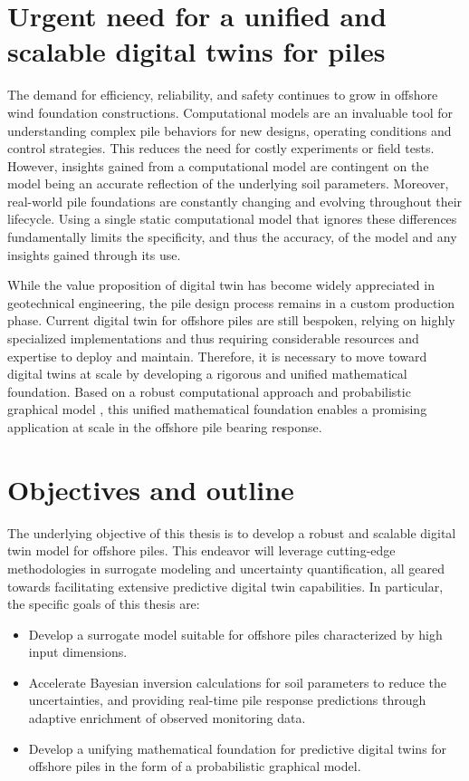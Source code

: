 \section{Urgent need for a unified and scalable digital twins for piles}
The demand for efficiency, reliability, and safety continues to grow in offshore wind foundation constructions. Computational models are an invaluable tool
 for understanding complex pile behaviors for new designs, operating conditions and control strategies. This reduces the need for costly experiments or field tests. However, insights gained from a computational model are contingent on the model being an accurate reflection of the underlying soil parameters. Moreover, real-world pile foundations are constantly changing and evolving throughout their lifecycle. Using a single static computational model that ignores these differences fundamentally limits the specificity,
 and thus the accuracy, of the model and any insights gained through its use.

 While the value proposition of digital twin has become widely appreciated in geotechnical engineering, the pile design process remains in a custom production phase. Current digital twin for offshore piles are still bespoken, relying on highly specialized implementations and thus requiring considerable resources and expertise to deploy and maintain. Therefore, it is necessary to move toward digital twins at scale by developing a rigorous and unified mathematical foundation. Based on a robust computational approach and  probabilistic graphical model \citep{kapteyn2021}, this unified mathematical foundation enables a promising application at scale in the offshore pile bearing response. 
 


\section{Objectives and outline}

The underlying objective of this thesis is to develop a robust and scalable digital twin model for offshore piles. This endeavor will leverage cutting-edge methodologies in surrogate modeling and uncertainty quantification, all geared towards facilitating extensive predictive digital twin capabilities. In particular, the specific goals of this thesis are:
\begin{itemize}
    \item Develop a surrogate model suitable for offshore piles characterized by high input dimensions.
    
    \item Accelerate Bayesian inversion calculations for soil parameters to reduce the uncertainties, and providing real-time pile response predictions through adaptive enrichment of observed monitoring data.
    
    \item Develop a unifying mathematical foundation for predictive digital twins for offshore piles in the form of a probabilistic graphical model.
\end{itemize}